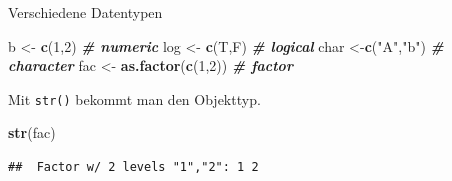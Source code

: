 \documentclass[
  ignorenonframetext,
]{beamer}
\newenvironment{Shaded}{\begin{snugshade}}{\end{snugshade}}
\newcommand{\CommentTok}[1]{\textcolor[rgb]{0.00,0.40,1.00}{\textbf{\textit{#1}}}}
\newcommand{\DecValTok}[1]{\textcolor[rgb]{0.27,0.67,0.26}{#1}}
\newcommand{\KeywordTok}[1]{\textcolor[rgb]{0.26,0.66,0.93}{\textbf{#1}}}
\newcommand{\NormalTok}[1]{\textcolor[rgb]{0.74,0.68,0.62}{#1}}
\newcommand{\StringTok}[1]{\textcolor[rgb]{0.02,0.61,0.04}{#1}}
\begin{document}
\begin{frame}[fragile]{Verschiedene Datentypen}
\protect\hypertarget{verschiedene-datentypen-1}{}

\begin{Shaded}
\begin{Highlighting}[]
\NormalTok{b <-}\StringTok{ }\KeywordTok{c}\NormalTok{(}\DecValTok{1}\NormalTok{,}\DecValTok{2}\NormalTok{) }\CommentTok{# numeric}
\NormalTok{log <-}\StringTok{ }\KeywordTok{c}\NormalTok{(T,F) }\CommentTok{# logical}
\NormalTok{char <-}\KeywordTok{c}\NormalTok{(}\StringTok{"A"}\NormalTok{,}\StringTok{"b"}\NormalTok{) }\CommentTok{# character}
\NormalTok{fac <-}\StringTok{ }\KeywordTok{as.factor}\NormalTok{(}\KeywordTok{c}\NormalTok{(}\DecValTok{1}\NormalTok{,}\DecValTok{2}\NormalTok{)) }\CommentTok{# factor}
\end{Highlighting}
\end{Shaded}

Mit \texttt{str()} bekommt man den Objekttyp.

\begin{Shaded}
\begin{Highlighting}[]
\KeywordTok{str}\NormalTok{(fac)}
\end{Highlighting}
\end{Shaded}

\begin{verbatim}
##  Factor w/ 2 levels "1","2": 1 2
\end{verbatim}

\end{frame}
\end{document}

